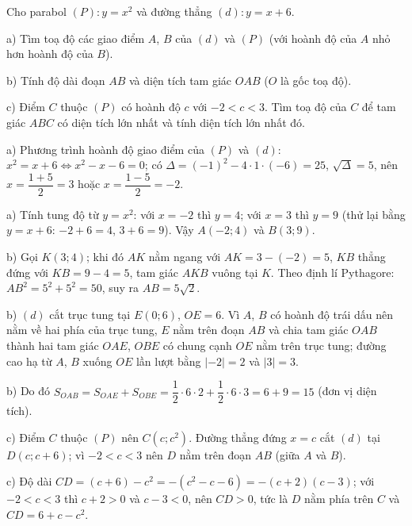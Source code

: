 \begin{problem}[9DS-HSB2-031]
Cho parabol $(P)\colon y = x^2$ và đường thẳng $(d)\colon y = x + 6$.

a) Tìm toạ độ các giao điểm $A$, $B$ của $(d)$ và $(P)$ (với hoành độ của $A$ nhỏ hơn hoành độ của $B$).

b) Tính độ dài đoạn $AB$ và diện tích tam giác $OAB$ ($O$ là gốc toạ độ).

c) Điểm $C$ thuộc $(P)$ có hoành độ $c$ với $-2 < c < 3$. Tìm toạ độ của $C$ để tam giác $ABC$ có diện tích lớn nhất và tính diện tích lớn nhất đó.

\begin{solution}
a) Phương trình hoành độ giao điểm của $(P)$ và $(d)$: $x^2 = x + 6 \Leftrightarrow x^2 - x - 6 = 0$; có $\Delta = (-1)^2 - 4 \cdot 1 \cdot (-6) = 25$, $\sqrt{\Delta} = 5$, nên $x = \dfrac{1 + 5}{2} = 3$ hoặc $x = \dfrac{1 - 5}{2} = -2$.

a) Tính tung độ từ $y = x^2$: với $x = -2$ thì $y = 4$; với $x = 3$ thì $y = 9$ (thử lại bằng $y = x + 6$: $-2 + 6 = 4$, $3 + 6 = 9$). Vậy $A(-2; 4)$ và $B(3; 9)$.

b) Gọi $K(3; 4)$; khi đó $AK$ nằm ngang với $AK = 3 - (-2) = 5$, $KB$ thẳng đứng với $KB = 9 - 4 = 5$, tam giác $AKB$ vuông tại $K$. Theo định lí Pythagore: $AB^2 = 5^2 + 5^2 = 50$, suy ra $AB = 5\sqrt{2}$.

b) $(d)$ cắt trục tung tại $E(0; 6)$, $OE = 6$. Vì $A$, $B$ có hoành độ trái dấu nên nằm về hai phía của trục tung, $E$ nằm trên đoạn $AB$ và chia tam giác $OAB$ thành hai tam giác $OAE$, $OBE$ có chung cạnh $OE$ nằm trên trục tung; đường cao hạ từ $A$, $B$ xuống $OE$ lần lượt bằng $|-2| = 2$ và $|3| = 3$.

b) Do đó $S_{OAB} = S_{OAE} + S_{OBE} = \dfrac{1}{2} \cdot 6 \cdot 2 + \dfrac{1}{2} \cdot 6 \cdot 3 = 6 + 9 = 15$ (đơn vị diện tích).

c) Điểm $C$ thuộc $(P)$ nên $C(c; c^2)$. Đường thẳng đứng $x = c$ cắt $(d)$ tại $D(c; c + 6)$; vì $-2 < c < 3$ nên $D$ nằm trên đoạn $AB$ (giữa $A$ và $B$).

c) Độ dài $CD = (c + 6) - c^2 = -(c^2 - c - 6) = -(c + 2)(c - 3)$; với $-2 < c < 3$ thì $c + 2 > 0$ và $c - 3 < 0$, nên $CD > 0$, tức là $D$ nằm phía trên $C$ và $CD = 6 + c - c^2$.


\end{solution}
\end{problem}
